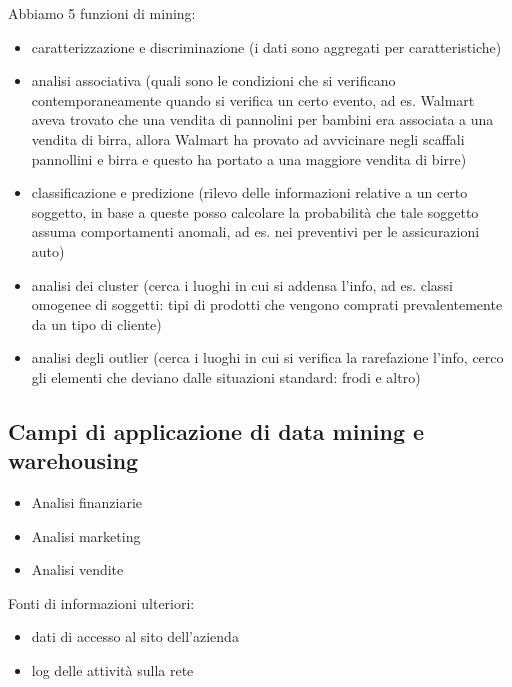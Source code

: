 Abbiamo 5 funzioni di mining:

\begin{itemize}

\item
  caratterizzazione e discriminazione (i dati sono aggregati per
  caratteristiche)
\item
  analisi associativa (quali sono le condizioni che si verificano
  contemporaneamente quando si verifica un certo evento, ad es. Walmart
  aveva trovato che una vendita di pannolini per bambini era associata a
  una vendita di birra, allora Walmart ha provato ad avvicinare negli
  scaffali pannollini e birra e questo ha portato a una maggiore vendita
  di birre)
\item
  classificazione e predizione (rilevo delle informazioni relative a un
  certo soggetto, in base a queste posso calcolare la probabilità che
  tale soggetto assuma comportamenti anomali, ad es. nei preventivi per
  le assicurazioni auto)
\item
  analisi dei cluster (cerca i luoghi in cui si addensa l'info, ad es.
  classi omogenee di soggetti: tipi di prodotti che vengono comprati
  prevalentemente da un tipo di cliente)
\item
  analisi degli outlier (cerca i luoghi in cui si verifica la
  rarefazione l'info, cerco gli elementi che deviano dalle situazioni
  standard: frodi e altro)
\end{itemize}

\subsection{Campi di applicazione di data mining e
warehousing}\label{campi-di-applicazione-di-data-mining-e-warehousing}

\begin{itemize}

\item
  Analisi finanziarie
\item
  Analisi marketing
\item
  Analisi vendite
\end{itemize}

Fonti di informazioni ulteriori:

\begin{itemize}

\item
  dati di accesso al sito dell'azienda
\item
  log delle attività sulla rete
\end{itemize}

